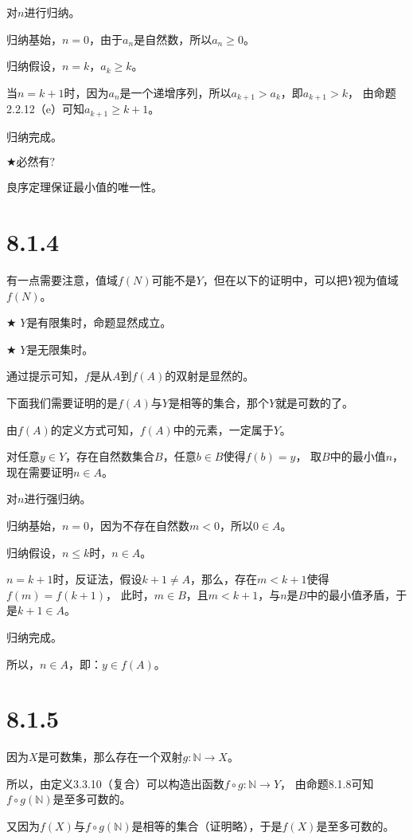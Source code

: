 \documentclass{article}
\theoremstyle{mystyle}
\begin{document}
对$n$进行归纳。

归纳基始，$n=0$，由于$a_n$是自然数，所以$a_n \geq 0$。

归纳假设，$n=k$，$a_k \geq k$。

当$n=k+1$时，因为$a_n$是一个递增序列，所以$a_{k+1} > a_k$，即$a_{k+1} > k$，
由命题2.2.12（e）可知$a_{k+1} \geq k+1$。

归纳完成。

$\bigstar \textbf{必然有?}$

良序定理保证最小值的唯一性。

\section*{8.1.4}

有一点需要注意，值域$f(N)$可能不是$Y$，但在以下的证明中，可以把$Y$视为值域$f(N)$。

$\bigstar$ $Y$是有限集时，命题显然成立。

$\bigstar$ $Y$是无限集时。

通过提示可知，$f$是从$A$到$f(A)$的双射是显然的。

下面我们需要证明的是$f(A)$与$Y$是相等的集合，那个$Y$就是可数的了。

由$f(A)$的定义方式可知，$f(A)$中的元素，一定属于$Y$。

对任意$y \in Y$，存在自然数集合$B$，任意$b \in B$使得$f(b) = y$，
取$B$中的最小值$n$，现在需要证明$n \in A$。

对$n$进行强归纳。

归纳基始，$n = 0$，因为不存在自然数$m < 0$，所以$0 \in A$。

归纳假设，$n \leq k$时，$n \in A$。

$n = k+1$时，反证法，假设$k + 1 \neq A$，那么，存在$m < k+1$使得$f(m) = f(k+1)$，
此时，$m \in B$，且$m < k+1$，与$n$是$B$中的最小值矛盾，于是$k + 1 \in A$。

归纳完成。

所以，$n \in A$，即：$y \in f(A)$。

\section*{8.1.5}

因为$X$是可数集，那么存在一个双射$g: \mathbb{N} \rightarrow X$。

所以，由定义3.3.10（复合）可以构造出函数$f \circ g: \mathbb{N} \rightarrow Y$，
由命题8.1.8可知$f \circ g(\mathbb{N})$是至多可数的。

又因为$f(X)$与$f \circ g(\mathbb{N})$是相等的集合（证明略），于是$f(X)$是至多可数的。
\end{document}
